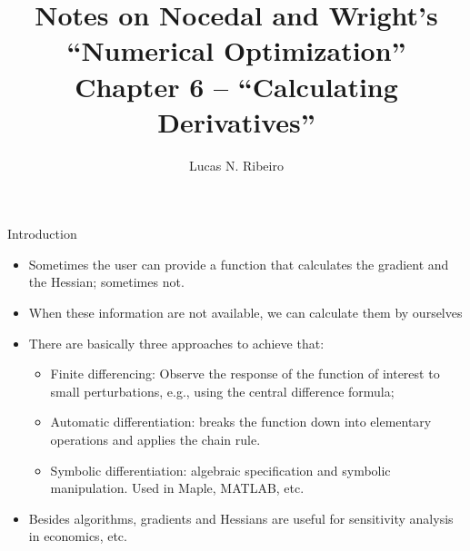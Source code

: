 \documentclass{beamer}
\title[Chapter 7]{Notes on Nocedal and Wright's ``Numerical Optimization''\\Chapter 6 --  ``Calculating Derivatives''}
\author{Lucas N. Ribeiro}
\date{}
\begin{document}
 
\frame{\titlepage}
 
\begin{frame}[allowframebreaks]{Introduction}
	\begin{itemize}
		\item Sometimes the user can provide a function that calculates the gradient and the Hessian; sometimes not.
		\item When these information are not available, we can calculate them by ourselves
		\item There are basically three approaches to achieve that:
		\begin{itemize}
			\item Finite differencing: Observe the response of the function of interest to small perturbations, e.g., using the central difference formula;
			\item Automatic differentiation: breaks the function down into elementary operations and applies the chain rule.
			\item Symbolic differentiation: algebraic specification and symbolic manipulation. Used in Maple, MATLAB, etc.
		\end{itemize} 
		\item Besides algorithms, gradients and Hessians are useful for sensitivity analysis in economics, etc.
	\end{itemize}
\end{frame}
\end{document}
